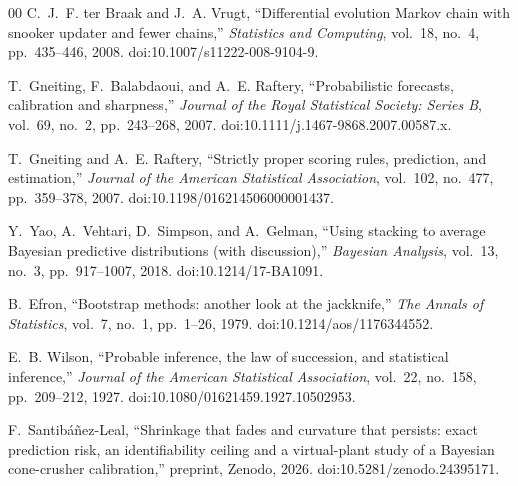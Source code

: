 \documentclass[journal]{IEEEtran}
\begin{document}
\begin{thebibliography}{00}
 C.~J.~F. ter Braak and J.~A. Vrugt, ``Differential evolution Markov chain with snooker updater and fewer
chains,'' \emph{Statistics and Computing}, vol.~18, no.~4, pp.~435--446, 2008. doi:10.1007/s11222-008-9104-9.

 T.~Gneiting, F.~Balabdaoui, and A.~E. Raftery, ``Probabilistic forecasts, calibration and
sharpness,'' \emph{Journal of the Royal Statistical Society: Series B}, vol.~69, no.~2, pp.~243--268, 2007.
doi:10.1111/j.1467-9868.2007.00587.x.

 T.~Gneiting and A.~E. Raftery, ``Strictly proper scoring rules, prediction, and estimation,''
\emph{Journal of the American Statistical Association}, vol.~102, no.~477, pp.~359--378, 2007.
doi:10.1198/016214506000001437.

 Y.~Yao, A.~Vehtari, D.~Simpson, and A.~Gelman, ``Using stacking to average Bayesian predictive distributions
(with discussion),'' \emph{Bayesian Analysis}, vol.~13, no.~3, pp.~917--1007, 2018. doi:10.1214/17-BA1091.

 B.~Efron, ``Bootstrap methods: another look at the jackknife,'' \emph{The Annals of Statistics}, vol.~7,
no.~1, pp.~1--26, 1979. doi:10.1214/aos/1176344552.

 E.~B. Wilson, ``Probable inference, the law of succession, and statistical inference,'' \emph{Journal of
the American Statistical Association}, vol.~22, no.~158, pp.~209--212, 1927. doi:10.1080/01621459.1927.10502953.

 F.~Santib\'a\~nez-Leal, ``Shrinkage that fades and curvature that persists: exact prediction risk, an
identifiability ceiling and a virtual-plant study of a Bayesian cone-crusher calibration,'' preprint, Zenodo, 2026.
doi:10.5281/zenodo.24395171.

\end{thebibliography}
\end{document}
